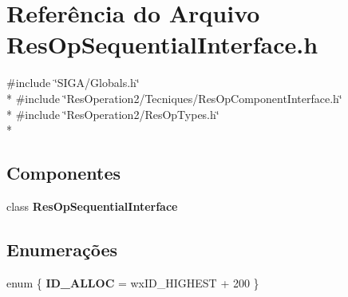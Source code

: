 \section{Referência do Arquivo Res\+Op\+Sequential\+Interface.\+h}
\label{_res_op_sequential_interface_8h}
{\ttfamily \#include \char`\"{}S\+I\+G\+A/\+Globals.\+h\char`\"{}}\\*
{\ttfamily \#include \char`\"{}Res\+Operation2/\+Tecniques/\+Res\+Op\+Component\+Interface.\+h\char`\"{}}\\*
{\ttfamily \#include \char`\"{}Res\+Operation2/\+Res\+Op\+Types.\+h\char`\"{}}\\*
\subsection*{Componentes}
\begin{DoxyCompactItemize}
\item 
class {\bf Res\+Op\+Sequential\+Interface}
\end{DoxyCompactItemize}
\subsection*{Enumerações}
\begin{DoxyCompactItemize}
\item 
enum \{ {\bf I\+D\+\_\+\+A\+L\+L\+OC} = wx\+I\+D\+\_\+\+H\+I\+G\+H\+E\+ST + 200
 \}
\end{DoxyCompactItemize}
